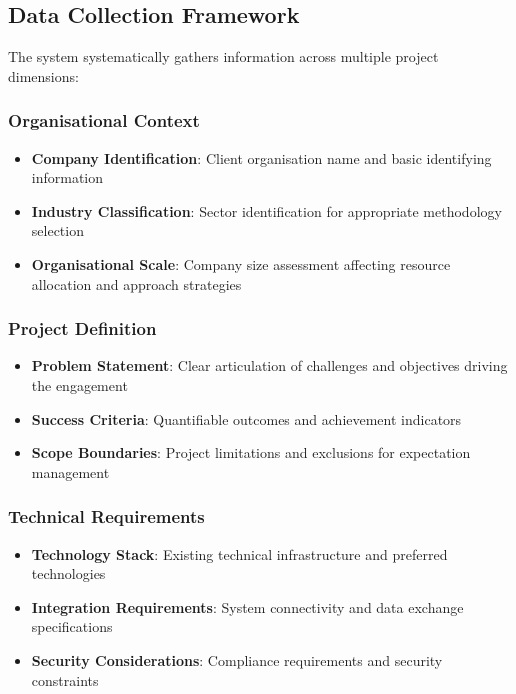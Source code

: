 \documentclass{article}
\begin{document}
\subsection{Data Collection Framework}
The system systematically gathers information across multiple project dimensions:

\subsubsection{Organisational Context}
\begin{itemize}
    \item \textbf{Company Identification}: Client organisation name and basic identifying information
    \item \textbf{Industry Classification}: Sector identification for appropriate methodology selection
    \item \textbf{Organisational Scale}: Company size assessment affecting resource allocation and approach strategies
\end{itemize}

\subsubsection{Project Definition}
\begin{itemize}
    \item \textbf{Problem Statement}: Clear articulation of challenges and objectives driving the engagement
    \item \textbf{Success Criteria}: Quantifiable outcomes and achievement indicators
    \item \textbf{Scope Boundaries}: Project limitations and exclusions for expectation management
\end{itemize}

\subsubsection{Technical Requirements}
\begin{itemize}
    \item \textbf{Technology Stack}: Existing technical infrastructure and preferred technologies
    \item \textbf{Integration Requirements}: System connectivity and data exchange specifications
    \item \textbf{Security Considerations}: Compliance requirements and security constraints
\end{itemize}
\end{document}
